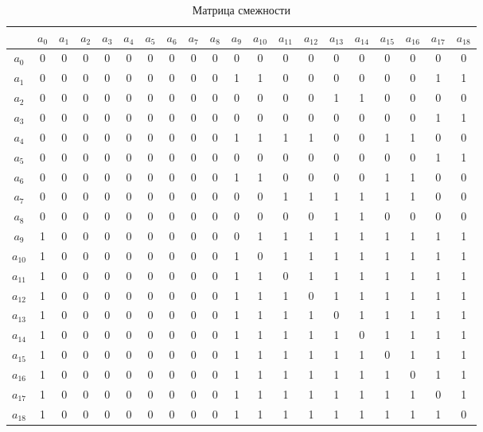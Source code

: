 \begin{table}[hbt!]
    \tiny
    \begin{tabular}{| c|| c| c c c c c c c c| c c c c c c c c c c|}

    \hline

    &$a_0$ &$a_1$ &$a_2$ &$a_3$ &$a_4$ &$a_5$ &$a_6$ &$a_7$ &$a_8$ &$a_9$& $a_{10}$&$a_{11}$&$a_{12}$& $a_{13}$& $a_{14}$& $a_{15}$& $a_{16}$& $a_{17}$& $a_{18}$  \\
    \hline \hline
    $a_0$ & 0 &0 &0 &0 &0 &0 &0 &0 &0 &0 &0 &0 &0 &0 &0 &0 &0 &0 &0  \\
    \hline
    $a_1$ & 0 &0 &0 &0 &0 &0 &0 &0 &0 &1 &1 &0 &0 &0 &0 &0 &0 &1 &1  \\
    $a_2$ & 0 &0 &0 &0 &0 &0 &0 &0 &0 &0 &0 &0 &0 &1 &1 &0 &0 &0 &0  \\
    $a_3$ & 0 &0 &0 &0 &0 &0 &0 &0 &0 &0 &0 &0 &0 &0 &0 &0 &0 &1 &1  \\
    $a_4$ & 0 &0 &0 &0 &0 &0 &0 &0 &0 &1 &1 &1 &1 &0 &0 &1 &1 &0 &0  \\
    $a_5$ & 0 &0 &0 &0 &0 &0 &0 &0 &0 &0 &0 &0 &0 &0 &0 &0 &0 &1 &1  \\
    $a_6$ & 0 &0 &0 &0 &0 &0 &0 &0 &0 &1 &1 &0 &0 &0 &0 &1 &1 &0 &0  \\
    $a_7$ & 0 &0 &0 &0 &0 &0 &0 &0 &0 &0 &0 &1 &1 &1 &1 &1 &1 &0 &0  \\
    $a_8$ & 0 &0 &0 &0 &0 &0 &0 &0 &0 &0 &0 &0 &0 &1 &1 &0 &0 &0 &0  \\
    \hline
    $a_9$ & 1 &0 &0 &0 &0 &0 &0 &0 &0 &0 &1 &1 &1 &1 &1 &1 &1 &1 &1  \\
    $a_{10}$ & 1 &0 &0 &0 &0 &0 &0 &0 &0 &1 &0 &1 &1 &1 &1 &1 &1 &1 &1  \\
    $a_{11}$ & 1 &0 &0 &0 &0 &0 &0 &0 &0 &1 &1 &0 &1 &1 &1 &1 &1 &1 &1  \\
    $a_{12}$ & 1 &0 &0 &0 &0 &0 &0 &0 &0 &1 &1 &1 &0 &1 &1 &1 &1 &1 &1  \\
    $a_{13}$ & 1 &0 &0 &0 &0 &0 &0 &0 &0 &1 &1 &1 &1 &0 &1 &1 &1 &1 &1  \\
    $a_{14}$ & 1 &0 &0 &0 &0 &0 &0 &0 &0 &1 &1 &1 &1 &1 &0 &1 &1 &1 &1  \\
    $a_{15}$ & 1 &0 &0 &0 &0 &0 &0 &0 &0 &1 &1 &1 &1 &1 &1 &0 &1 &1 &1  \\
    $a_{16}$ & 1 &0 &0 &0 &0 &0 &0 &0 &0 &1 &1 &1 &1 &1 &1 &1 &0 &1 &1  \\
    $a_{17}$ & 1 &0 &0 &0 &0 &0 &0 &0 &0 &1 &1 &1 &1 &1 &1 &1 &1 &0 &1  \\
    $a_{18}$ & 1 &0 &0 &0 &0 &0 &0 &0 &0 &1 &1 &1 &1 &1 &1 &1 &1 &1 &0  \\
    \hline
    \end{tabular}\caption{Матрица смежности}\label{tab:part3_mip_adj_mat}
\end{table}


